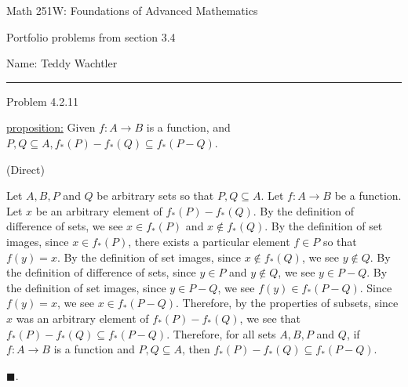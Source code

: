 \documentclass{article}
\theoremstyle{definition}
\renewcommand{\qed}{\blacksquare}
\newcommand{\img}{_{*}}
\begin{document}
	\begin{center}
		\Large{Math 251W: Foundations of Advanced Mathematics}

		\normalsize Portfolio problems from section 3.4

		\hfill Name: Teddy Wachtler
		\hrule
		\vspace{0.4cm}
		\vspace{0.75cm}
	\end{center}


	\noindent Problem 4.2.11
	\vspace{0.3cm}

	\underline{proposition:}
	Given $f : A \rightarrow B$ is a function, and $P, Q \subseteq A, f \img(P) - f \img(Q) \subseteq f \img(P - Q)$.

	\vspace{.2cm}
	 (Direct)
	\vspace{.15cm}

	Let $A, B, P$ and $Q$ be arbitrary sets so that $P, Q \subseteq A$.
	Let $f : A \rightarrow B$ be a function.
	Let $x$ be an arbitrary element of $f \img(P) - f \img(Q)$.
	By the definition of difference of sets, we see $x \in f \img(P)$ and $x \not \in f \img(Q)$.
	By the definition of set images, since $x \in f \img(P)$, there exists a particular element $f \in P$ so that $f(y) = x$.
	By the definition of set images, since $x \not \in f \img(Q)$, we see $y \not \in Q$.
	By the definition of difference of sets, since $y \in P$ and $y \not \in Q$, we see $y \in P - Q$.
	By the definition of set images, since $y \in P - Q$, we see $f(y) \in f \img(P - Q)$.
	Since $f(y) = x$, we see $x \in f \img(P - Q)$.
	Therefore, by the properties of subsets, since $x$ was an arbitrary element of $f \img(P) - f \img(Q)$, we see that $f \img(P) - f \img(Q) \subseteq f \img(P - Q)$.
	Therefore, for all sets $A, B, P$ and $Q$, if $f : A \rightarrow B$ is a function and $P, Q \subseteq A$, then $f \img(P) - f \img(Q) \subseteq f \img(P - Q)$.

	$\qed$.

	\vspace{1cm}

\end{document}
